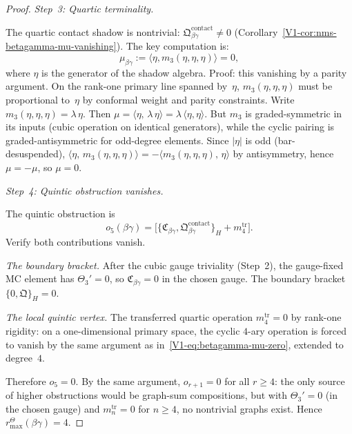 \begin{proof}
\medskip
\emph{Step~3: Quartic terminality.}

The quartic contact shadow is nontrivial:
$\mathfrak{Q}^{\mathrm{contact}}_{\beta\gamma} \neq 0$
(Corollary~\ref*{V1-cor:nms-betagamma-mu-vanishing}).
The key computation is:
\begin{equation}%
\mu_{\beta\gamma}
:= \langle \eta, m_3(\eta, \eta, \eta) \rangle = 0,
\end{equation}
where $\eta$ is the generator of the shadow algebra.
Proof: this vanishing by a parity argument.
On the rank-one primary line spanned by~$\eta$,
$m_3(\eta,\eta,\eta)$ must be proportional to~$\eta$
by conformal weight and parity constraints. Write
$m_3(\eta,\eta,\eta) = \lambda\,\eta$. Then
$\mu = \langle \eta,\, \lambda\,\eta \rangle
= \lambda\,\langle \eta, \eta \rangle$.
But $m_3$ is graded-symmetric in its inputs (cubic
operation on identical generators), while the cyclic
pairing is graded-antisymmetric for odd-degree elements.
Since $|\eta|$ is odd (bar-desuspended),
$\langle \eta,\, m_3(\eta,\eta,\eta) \rangle
= -\langle m_3(\eta,\eta,\eta),\, \eta \rangle$
by antisymmetry, hence $\mu = -\mu$, so $\mu = 0$.

\medskip
\emph{Step~4: Quintic obstruction vanishes.}

The quintic obstruction is
\begin{equation}%
o_5(\beta\gamma) =
\bigl[\{\mathfrak{C}_{\beta\gamma},
\mathfrak{Q}^{\mathrm{contact}}_{\beta\gamma}\}_{H}
+ m_4^{\mathrm{tr}}\bigr].
\end{equation}
Verify both contributions vanish.

\emph{The boundary bracket.}
After the cubic gauge triviality (Step~2), the
gauge-fixed MC element has $\Theta_3' = 0$, so
$\mathfrak{C}_{\beta\gamma} = 0$ in the chosen gauge.
The boundary bracket $\{0, \mathfrak{Q}\}_H = 0$.

\emph{The local quintic vertex.}
The transferred quartic operation $m_4^{\mathrm{tr}} = 0$
by rank-one rigidity: on a one-dimensional primary space,
the cyclic $4$-ary operation is forced to vanish by the
same argument as in~\eqref{V1-eq:betagamma-mu-zero},
extended to degree~$4$.

Therefore $o_5 = 0$. By the same argument, $o_{r+1} = 0$
for all $r \geq 4$: the only source of higher obstructions
would be graph-sum compositions, but with $\Theta_3' = 0$
(in the chosen gauge) and $m_n^{\mathrm{tr}} = 0$ for
$n \geq 4$, no nontrivial graphs exist. Hence
\(r^\Theta_{\max}(\beta\gamma) = 4\).
\end{proof}

